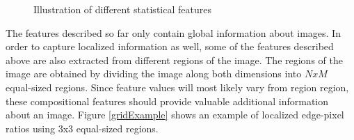 \begin{figure}[!h]
\begin{center}
   
  \end{center}
  \caption{Illustration of different statistical features}
  \label{featureImg}
\end{figure}


The features described so far only contain global information about images. In order to capture localized information as well, some of the features described above are also extracted from different regions of the image. The regions of the image are obtained by dividing the image along both dimensions into $NxM$ equal-sized regions. Since feature values will most likely vary from region region, these compositional features should provide valuable additional information about an image. Figure \ref{gridExample} shows an example of localized edge-pixel ratios using 3x3 equal-sized regions.\\ 

